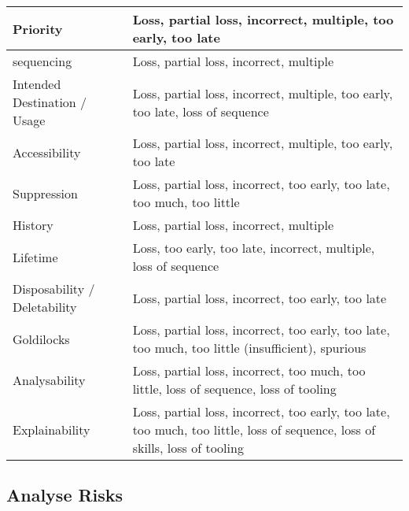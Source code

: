 \begin{longtable}{|L{}|L{}|}
  {Priority} & {Loss, partial loss, incorrect, multiple, too early, too late}\\\hline
  {\Gls{sequencing}} & {Loss, partial loss, incorrect, multiple}\\\hline
  {Intended Destination / Usage} & {Loss, partial loss, incorrect, multiple, too early, too late, loss of sequence}\\\hline
  {Accessibility} & {Loss, partial loss, incorrect, multiple, too early, too late}\\\hline
  {Suppression} & {Loss, partial loss, incorrect, too early, too late, too much, too little}\\\hline
  {History} & {Loss, partial loss, incorrect, multiple}\\\hline
  {Lifetime} & {Loss, too early, too late, incorrect, multiple, loss of sequence}\\\hline
  {Disposability / Deletability} & {Loss, partial loss, incorrect, too early, too late}\\\hline
  {Goldilocks} & {Loss, partial loss, incorrect, too early, too late, too much,
    too little (insufficient), spurious}\\\hline
  {Analysability} & {Loss, partial loss, incorrect, too much, too little, loss of sequence, loss of tooling}\\\hline
  {Explainability} & {Loss, partial loss, incorrect, too early, too late, too much, too little, loss of sequence, loss of skills, loss of tooling}\\\hline
\end{longtable}

\clearpage
\subsection{Analyse Risks}
